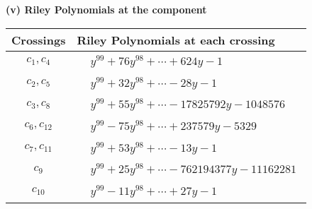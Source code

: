 \documentclass[1p]{elsarticle_modified}
\theoremstyle{definition}
\begin{document}
\newpage\renewcommand{\arraystretch}{1}
\flushleft \textbf{(v) Riley Polynomials at the component}\newline \\
\begin{tabular}{m{50pt}|m{274pt}}
Crossings & \hspace{64pt}Riley Polynomials at each crossing \\
\hline $$\begin{aligned}c_{1},c_{4}\end{aligned}$$&$\begin{aligned}
&y^{99}+76 y^{98}+\cdots+624 y-1
\end{aligned}$\\
\hline $$\begin{aligned}c_{2},c_{5}\end{aligned}$$&$\begin{aligned}
&y^{99}+32 y^{98}+\cdots-28 y-1
\end{aligned}$\\
\hline $$\begin{aligned}c_{3},c_{8}\end{aligned}$$&$\begin{aligned}
&y^{99}+55 y^{98}+\cdots-17825792 y-1048576
\end{aligned}$\\
\hline $$\begin{aligned}c_{6},c_{12}\end{aligned}$$&$\begin{aligned}
&y^{99}-75 y^{98}+\cdots+237579 y-5329
\end{aligned}$\\
\hline $$\begin{aligned}c_{7},c_{11}\end{aligned}$$&$\begin{aligned}
&y^{99}+53 y^{98}+\cdots-13 y-1
\end{aligned}$\\
\hline $$\begin{aligned}c_{9}\end{aligned}$$&$\begin{aligned}
&y^{99}+25 y^{98}+\cdots-762194377 y-11162281
\end{aligned}$\\
\hline $$\begin{aligned}c_{10}\end{aligned}$$&$\begin{aligned}
&y^{99}-11 y^{98}+\cdots+27 y-1
\end{aligned}$\\
\hline
\end{tabular}\\~\\
\end{document}
